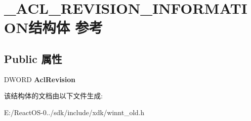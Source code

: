 \hypertarget{struct___a_c_l___r_e_v_i_s_i_o_n___i_n_f_o_r_m_a_t_i_o_n}{}\section{\+\_\+\+A\+C\+L\+\_\+\+R\+E\+V\+I\+S\+I\+O\+N\+\_\+\+I\+N\+F\+O\+R\+M\+A\+T\+I\+O\+N结构体 参考}
\label{struct___a_c_l___r_e_v_i_s_i_o_n___i_n_f_o_r_m_a_t_i_o_n}
\subsection*{Public 属性}
\begin{DoxyCompactItemize}
\item 
\mbox{\label{struct___a_c_l___r_e_v_i_s_i_o_n___i_n_f_o_r_m_a_t_i_o_n_ac8e3bdd9e135c1dd393de8af3e8f7ee5}} 
D\+W\+O\+RD {\bfseries Acl\+Revision}
\end{DoxyCompactItemize}


该结构体的文档由以下文件生成\+:\begin{DoxyCompactItemize}
\item 
E\+:/\+React\+O\+S-\/0../sdk/include/xdk/winnt\+\_\+old.\+h\end{DoxyCompactItemize}
